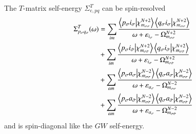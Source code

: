 \documentclass[aip,jcp,reprint,noshowkeys,superscriptaddress]{revtex4-1}
\newcommand{\co}{\text{c}}
\newcommand{\e}[1]{\eps_{#1}}
\newcommand{\eps}{\varepsilon}
\newcommand{\sig}{\sigma}
\newcommand{\bsig}{{\Bar{\sigma}}}
\begin{document}
The  $T$-matrix self-energy $\Sigma^T_{\co,pq}$ can be spin-resolved
\begin{equation}
\begin{split}
	\Sigma^{T}_{p_\sig q_\sig}(\omega) 
	& = \sum_{i m} \frac{\braket{p_\sig i_\sig}{\chi_{m_{\sig\sig}}^{N+2}} \braket{q_\sig i_\sig}{\chi_{m_{\sig\sig}}^{N+2}}}{\omega + \e{i_\sig}{} - \Omega_{m_{\sig\sig}}^{N+2}}
	\\
	& + \sum_{i m} \frac{\braket{p_\sig i_\bsig}{\chi_{m_{\sig\bsig}}^{N+2}} \braket{q_\sig i_\bsig}{\chi_{m_{\sig\bsig}}^{N+2}}}{\omega + \e{i_\sig}{} - \Omega_{m_{\sig\bsig}}^{N+2}}
	\\
	& + \sum_{a m} \frac{\braket{p_\sig a_\sig}{\chi_{m_{\sig\sig}}^{N-2}} \braket{q_\sig a_\sig}{\chi_{m_{\sig\sig}}^{N-2}}}{\omega + \e{a_\sig}{} - \Omega_{m_{\sig\sig}}^{N-2}}
	\\
	& + \sum_{a m} \frac{\braket{p_\sig a_\bsig}{\chi_{m_{\sig\bsig}}^{N-2}} \braket{q_\sig a_\bsig}{\chi_{m_{\sig\bsig}}^{N-2}}}{\omega + \e{a_\sig}{} - \Omega_{m_{\sig\bsig}}^{N-2}}
\end{split}
\end{equation}
and is spin-diagonal like the $GW$ self-energy.



\end{document}

